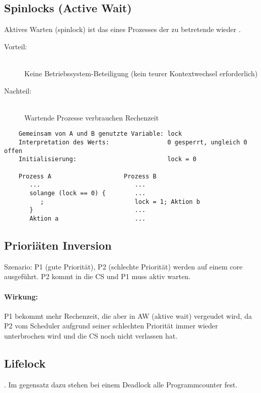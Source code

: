 \subsection{Spinlocks (Active Wait)}
Aktives Warten (spinlock) ist das  eines Prozesses  der zu betretende  wieder .


\begin{description}
\item[Vorteil:] \hfill \\
	Keine Betriebssystem-Beteiligung (kein teurer Kontextwechsel erforderlich)
\item[Nachteil:] \hfill \\
	Wartende Prozesse verbrauchen Rechenzeit
\end{description}

\begin{verbatim}
    Gemeinsam von A und B genutzte Variable: lock
    Interpretation des Werts:                0 gesperrt, ungleich 0 offen 
    Initialisierung:                         lock = 0
           
    Prozess A                    Prozess B
       ...                          ...
       solange (lock == 0) {        ...
          ;                         lock = 1; Aktion b
       }                            ...
       Aktion a                     ...
\end{verbatim}

\subsection{Prioriäten Inversion}
Szenario: P1 (gute Priorität), P2 (schlechte Priorität) werden auf einem core ausgeführt. P2 kommt in die CS und P1 muss aktiv warten.

\paragraph*{Wirkung:}
P1 bekommt mehr Rechenzeit, die aber in AW (aktive wait) vergeudet wird, da P2 vom Scheduler aufgrund seiner schlechten Priorität immer wieder unterbrochen wird und die CS noch nicht verlassen hat.

\subsection{Lifelock}
. Im gegensatz dazu stehen bei einem Deadlock alle Programmcounter fest.

